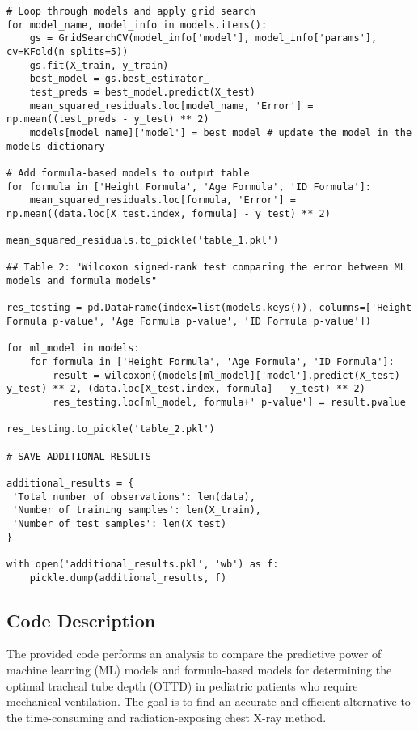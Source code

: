 \documentclass[11pt]{article}
\begin{document}
\begin{verbatim}
# Loop through models and apply grid search
for model_name, model_info in models.items():
    gs = GridSearchCV(model_info['model'], model_info['params'], cv=KFold(n_splits=5))
    gs.fit(X_train, y_train)
    best_model = gs.best_estimator_
    test_preds = best_model.predict(X_test)
    mean_squared_residuals.loc[model_name, 'Error'] = np.mean((test_preds - y_test) ** 2)
    models[model_name]['model'] = best_model # update the model in the models dictionary

# Add formula-based models to output table
for formula in ['Height Formula', 'Age Formula', 'ID Formula']:
    mean_squared_residuals.loc[formula, 'Error'] = np.mean((data.loc[X_test.index, formula] - y_test) ** 2)

mean_squared_residuals.to_pickle('table_1.pkl')

## Table 2: "Wilcoxon signed-rank test comparing the error between ML models and formula models"

res_testing = pd.DataFrame(index=list(models.keys()), columns=['Height Formula p-value', 'Age Formula p-value', 'ID Formula p-value'])

for ml_model in models:
    for formula in ['Height Formula', 'Age Formula', 'ID Formula']:
        result = wilcoxon((models[ml_model]['model'].predict(X_test) - y_test) ** 2, (data.loc[X_test.index, formula] - y_test) ** 2)
        res_testing.loc[ml_model, formula+' p-value'] = result.pvalue

res_testing.to_pickle('table_2.pkl')

# SAVE ADDITIONAL RESULTS

additional_results = {
 'Total number of observations': len(data),
 'Number of training samples': len(X_train),
 'Number of test samples': len(X_test)
}

with open('additional_results.pkl', 'wb') as f:
    pickle.dump(additional_results, f)

\end{verbatim}

\subsection{Code Description}

The provided code performs an analysis to compare the predictive power of machine learning (ML) models and formula-based models for determining the optimal tracheal tube depth (OTTD) in pediatric patients who require mechanical ventilation. The goal is to find an accurate and efficient alternative to the time-consuming and radiation-exposing chest X-ray method.
\end{document}
